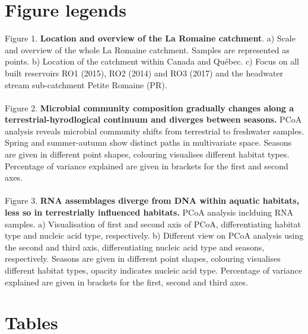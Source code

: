 \documentclass[12pt,a4paper]{article} %
\begin{document}
\section*{Figure legends}
Figure 1. \textbf{Location and overview of the La Romaine catchment}. a) Scale and overview of the whole La Romaine catchment. Samples are represented as points. b) Location of the catchment within Canada and Québec. c) Focus on all built reservoirs RO1 (2015), RO2 (2014) and RO3 (2017) and the headwater stream sub-catchment Petite Romaine (PR). \\
\\
Figure 2. \textbf{Microbial community composition gradually changes along a terrestrial-hyrodlogical continuum and diverges between seasons.} PCoA analysis reveals microbial community shifts from terrestrial to freshwater samples. Spring and summer-autumn show distinct paths in multivariate space. Seasons are given in different point shapes, colouring visualises different habitat types. Percentage of variance explained are given in brackets for the first and second axes. \\
\\
Figure 3. \textbf{RNA assemblages diverge from DNA within aquatic habitats, less so in terrestrially influenced habitats.} PCoA analysis inclduing RNA samples. a) Visualisation of first and second axis of PCoA, differentiating habitat type and nucleic acid type, respectively. b) Different view on PCoA analysis using the second and third axis, differentiating nucleic acid type and seasons, respectively. Seasons are given in different point shapes, colouring visualises different habitat types, opacity indicates nucleic acid type. Percentage of variance explained are given in brackets for the first, second and third axes.

\section*{Tables}
\end{document}
